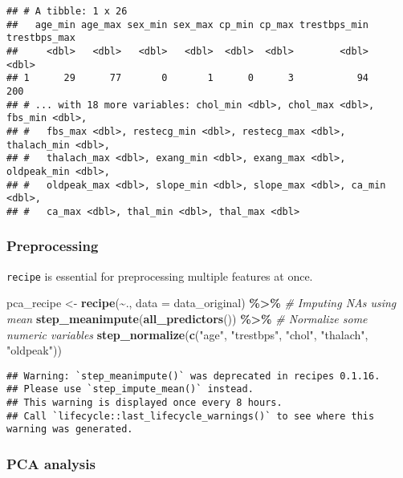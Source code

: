 \documentclass[
]{book}
\newenvironment{Shaded}{\begin{snugshade}}{\end{snugshade}}
\newcommand{\CommentTok}[1]{\textcolor[rgb]{0.56,0.35,0.01}{\textit{#1}}}
\newcommand{\DataTypeTok}[1]{\textcolor[rgb]{0.13,0.29,0.53}{#1}}
\newcommand{\KeywordTok}[1]{\textcolor[rgb]{0.13,0.29,0.53}{\textbf{#1}}}
\newcommand{\NormalTok}[1]{#1}
\newcommand{\OperatorTok}[1]{\textcolor[rgb]{0.81,0.36,0.00}{\textbf{#1}}}
\newcommand{\StringTok}[1]{\textcolor[rgb]{0.31,0.60,0.02}{#1}}
\begin{document}
\begin{verbatim}
## # A tibble: 1 x 26
##   age_min age_max sex_min sex_max cp_min cp_max trestbps_min trestbps_max
##     <dbl>   <dbl>   <dbl>   <dbl>  <dbl>  <dbl>        <dbl>        <dbl>
## 1      29      77       0       1      0      3           94          200
## # ... with 18 more variables: chol_min <dbl>, chol_max <dbl>, fbs_min <dbl>,
## #   fbs_max <dbl>, restecg_min <dbl>, restecg_max <dbl>, thalach_min <dbl>,
## #   thalach_max <dbl>, exang_min <dbl>, exang_max <dbl>, oldpeak_min <dbl>,
## #   oldpeak_max <dbl>, slope_min <dbl>, slope_max <dbl>, ca_min <dbl>,
## #   ca_max <dbl>, thal_min <dbl>, thal_max <dbl>
\end{verbatim}

\hypertarget{preprocessing}{%
\subsubsection{Preprocessing}\label{preprocessing}}

\texttt{recipe} is essential for preprocessing multiple features at once.

\begin{Shaded}
\begin{Highlighting}[]
\NormalTok{pca\_recipe \textless{}{-}}\StringTok{ }\KeywordTok{recipe}\NormalTok{(}\OperatorTok{\textasciitilde{}}\NormalTok{., }\DataTypeTok{data =}\NormalTok{ data\_original) }\OperatorTok{\%\textgreater{}\%}
\StringTok{  }\CommentTok{\# Imputing NAs using mean}
\StringTok{  }\KeywordTok{step\_meanimpute}\NormalTok{(}\KeywordTok{all\_predictors}\NormalTok{()) }\OperatorTok{\%\textgreater{}\%}
\StringTok{  }\CommentTok{\# Normalize some numeric variables}
\StringTok{  }\KeywordTok{step\_normalize}\NormalTok{(}\KeywordTok{c}\NormalTok{(}\StringTok{"age"}\NormalTok{, }\StringTok{"trestbps"}\NormalTok{, }\StringTok{"chol"}\NormalTok{, }\StringTok{"thalach"}\NormalTok{, }\StringTok{"oldpeak"}\NormalTok{))}
\end{Highlighting}
\end{Shaded}

\begin{verbatim}
## Warning: `step_meanimpute()` was deprecated in recipes 0.1.16.
## Please use `step_impute_mean()` instead.
## This warning is displayed once every 8 hours.
## Call `lifecycle::last_lifecycle_warnings()` to see where this warning was generated.
\end{verbatim}

\hypertarget{pca-analysis}{%
\subsubsection{PCA analysis}\label{pca-analysis}}
\end{document}
